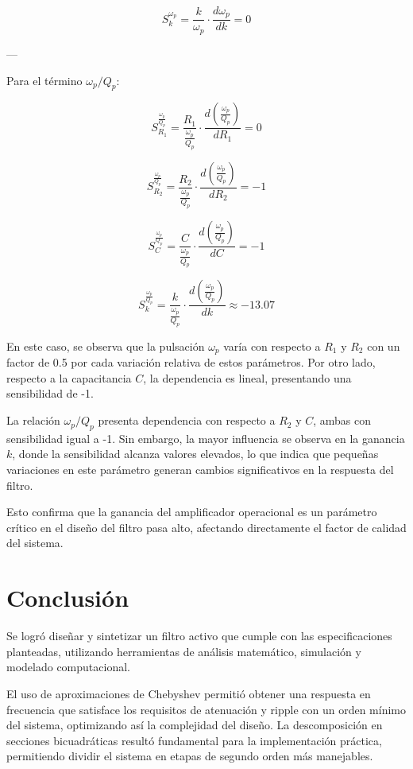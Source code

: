 \documentclass[12pt,a4paper]{article}
\begin{document}
\[
S_k^{\omega_p} =
\frac{k}{\omega_p} \cdot \frac{d\omega_p}{dk}
= 0
\]

---

Para el término \( \omega_p / Q_p \):

\[
S_{R_1}^{\frac{\omega_p}{Q_p}} =
\frac{R_1}{\frac{\omega_p}{Q_p}} \cdot
\frac{d\left(\frac{\omega_p}{Q_p}\right)}{dR_1}
= 0
\]

\[
S_{R_2}^{\frac{\omega_p}{Q_p}} =
\frac{R_2}{\frac{\omega_p}{Q_p}} \cdot
\frac{d\left(\frac{\omega_p}{Q_p}\right)}{dR_2}
= -1
\]

\[
S_C^{\frac{\omega_p}{Q_p}} =
\frac{C}{\frac{\omega_p}{Q_p}} \cdot
\frac{d\left(\frac{\omega_p}{Q_p}\right)}{dC}
= -1
\]

\[
S_k^{\frac{\omega_p}{Q_p}} =
\frac{k}{\frac{\omega_p}{Q_p}} \cdot
\frac{d\left(\frac{\omega_p}{Q_p}\right)}{dk}
\approx -13.07
\]

En este caso, se observa que la pulsación \( \omega_p \) varía con respecto a \(R_1\) y \(R_2\) con un factor de 0.5 por cada variación relativa de estos parámetros. Por otro lado, respecto a la capacitancia \(C\), la dependencia es lineal, presentando una sensibilidad de -1.

La relación \( \omega_p / Q_p \) presenta dependencia con respecto a \(R_2\) y \(C\), ambas con sensibilidad igual a -1. Sin embargo, la mayor influencia se observa en la ganancia \(k\), donde la sensibilidad alcanza valores elevados, lo que indica que pequeñas variaciones en este parámetro generan cambios significativos en la respuesta del filtro.

Esto confirma que la ganancia del amplificador operacional es un parámetro crítico en el diseño del filtro pasa alto, afectando directamente el factor de calidad del sistema.
\newline

\section{Conclusión}

Se logró diseñar y sintetizar un filtro activo que cumple con las especificaciones planteadas, utilizando herramientas de análisis matemático, simulación y modelado computacional.

El uso de aproximaciones de Chebyshev permitió obtener una respuesta en frecuencia que satisface los requisitos de atenuación y ripple con un orden mínimo del sistema, optimizando así la complejidad del diseño. La descomposición en secciones bicuadráticas resultó fundamental para la implementación práctica, permitiendo dividir el sistema en etapas de segundo orden más manejables.
\end{document}
